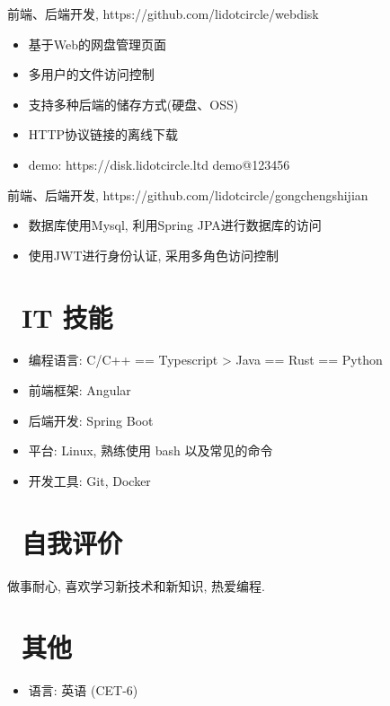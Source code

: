 \documentclass{resume}
\begin{document}
\begin{onehalfspacing}
前端、后端开发, https://github.com/lidotcircle/webdisk
\begin{itemize}
  \item 基于Web的网盘管理页面
  \item 多用户的文件访问控制
  \item 支持多种后端的储存方式(硬盘、OSS)
  \item HTTP协议链接的离线下载
  \item demo: https://disk.lidotcircle.ltd demo@123456
\end{itemize}
\end{onehalfspacing}

\begin{onehalfspacing}
前端、后端开发, https://github.com/lidotcircle/gongchengshijian
\begin{itemize}
  \item 数据库使用Mysql, 利用Spring JPA进行数据库的访问
  \item 使用JWT进行身份认证, 采用多角色访问控制
\end{itemize}
\end{onehalfspacing}

\section{\faCogs\ IT 技能}
\begin{itemize}[parsep=0.5ex]
  \item 编程语言: C/C++ == Typescript > Java == Rust == Python
  \item 前端框架: Angular
  \item 后端开发: Spring Boot
  \item 平台: Linux, 熟练使用 bash 以及常见的命令
  \item 开发工具: Git, Docker
\end{itemize}

\section{\faArrowCircleRight\ 自我评价}
做事耐心, 喜欢学习新技术和新知识, 热爱编程.

\section{\faInfo\ 其他}
\begin{itemize}[parsep=0.5ex]
  \item 语言: 英语 (CET-6)
\end{itemize}

%
%
\end{document}
